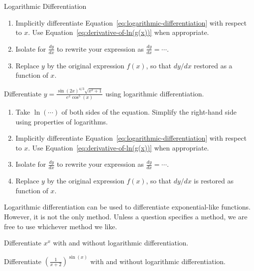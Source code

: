 \documentclass[../main.tex]{subfiles}
\begin{document}
\begin{lesson}{Logarithmic Differentiation}
\begin{enumerate}
    \item Implicitly differentiate Equation~\eqref{eq:logarithmic-differentiation} with respect to \(x\). Use Equation~\eqref{eq:derivative-of-ln(g(x))} when appropriate.

    \item Isolate for \(\frac{dy}{dx}\) to rewrite your expression as \(\frac{dy}{dx} = \cdots\). 
    \item Replace \(y\) by the original expression \(f(x)\), so that \(dy/dx\) restored as a function of \(x\).
  \end{enumerate}
  \clearpage

  \begin{example} \label{ex:log-diff}
    Differentiate \(y = \frac{\sin(2x)^{4/3} \sqrt{x^{2}+1}}{e^{x} \cos^{5}(x)}\) using logarithmic differentiation.

    \begin{enumerate}[noitemsep]
      \item Take \(\ln(\cdots{})\) of both sides of the equation. Simplify the right-hand side using properties of logarithms.
      \item Implicitly differentiate Equation~\eqref{eq:logarithmic-differentiation} with respect to \(x\). Use Equation~\eqref{eq:derivative-of-ln(g(x))} when appropriate.
      \item Isolate for \(\frac{dy}{dx}\) to rewrite your expression as \(\frac{dy}{dx} = \cdots\). 
      \item Replace \(y\) by the original expression \(f(x)\), so that \(dy/dx\) is restored as function of \(x\).
    \end{enumerate}
  \end{example}

  Logarithmic differentiation can be used to differentiate exponential-like functions.  However, it is not the only method. Unless a question specifies a method, we are free to use whichever method we like.
  \begin{example}
    Differentiate \(x^{x}\) with and without logarithmic differentiation.

  \end{example}

  \clearpage

  \begin{example}
    Differentiate \(\left( \frac{1}{x+2} \right)^{\sin(x)}\) with and without logarithmic differentiation.
  \end{example}


\end{lesson}
\end{document}
